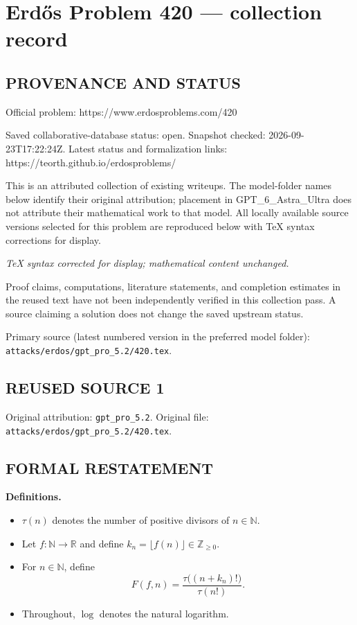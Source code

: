\section*{Erd\H{o}s Problem 420 --- collection record}

\subsection*{PROVENANCE AND STATUS}
Official problem: https://www.erdosproblems.com/420

Saved collaborative-database status: open.
Snapshot checked: 2026-09-23T17:22:24Z.
Latest status and formalization links: https://teorth.github.io/erdosproblems/

This is an attributed collection of existing writeups. The model-folder names below identify their original attribution; placement in GPT\_6\_Astra\_Ultra does not attribute their mathematical work to that model. All locally available source versions selected for this problem are reproduced below with TeX syntax corrections for display.

\emph{TeX syntax corrected for display; mathematical content unchanged.}

Proof claims, computations, literature statements, and completion estimates in the reused text have not been independently verified in this collection pass. A source claiming a solution does not change the saved upstream status.

Primary source (latest numbered version in the preferred model folder): \texttt{attacks/erdos/gpt\_pro\_5.2/420.tex}.

\subsection*{REUSED SOURCE 1}
Original attribution: \texttt{gpt\_pro\_5.2}.
Original file: \texttt{attacks/erdos/gpt\_pro\_5.2/420.tex}.


\subsection*{FORMAL RESTATEMENT}
\textbf{Definitions.}
\begin{itemize}
\item $\tau(n)$ denotes the number of positive divisors of $n\in\mathbb{N}$.
\item Let $f:\mathbb{N}\to\mathbb{R}$ and define $k_n=\lfloor f(n)\rfloor\in\mathbb{Z}_{\ge 0}$.
\item For $n\in\mathbb{N}$, define
\[
F(f,n)=\frac{\tau\big((n+k_n)!\big)}{\tau(n!)}.
\]
\item Throughout, $\log$ denotes the natural logarithm.
\end{itemize}

